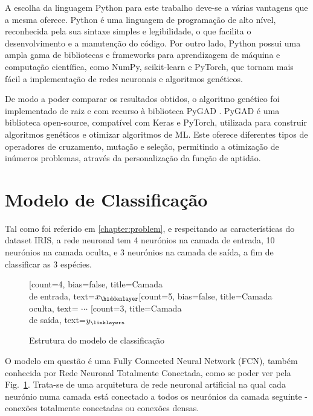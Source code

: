 A escolha da linguagem Python para este trabalho deve-se a várias vantagens que a mesma oferece. Python é uma linguagem de programação de alto nível, reconhecida pela sua sintaxe simples e legibilidade, o que facilita o desenvolvimento e a manutenção do código. Por outro lado, Python possui uma ampla gama de bibliotecas e frameworks para aprendizagem de máquina e computação científica, como NumPy, scikit-learn e PyTorch, que tornam mais fácil a implementação de redes neuronais e algoritmos genéticos.

De modo a poder comparar os resultados obtidos, o algoritmo genético foi implementado de raiz e com recurso à biblioteca PyGAD \cite{Gad2021PyGAD:Library}. PyGAD é uma biblioteca open-source, compatível com Keras e PyTorch, utilizada para construir algoritmos genéticos e otimizar algoritmos de ML. Este oferece diferentes tipos de operadores de cruzamento, mutação e seleção, permitindo a otimização de inúmeros problemas, através da personalização da função de aptidão.

\section{Modelo de Classificação}\label{sec:neural_net}

Tal como foi referido em \ref{chapter:problem}, e respeitando as características do dataset IRIS, a rede neuronal tem 4 neurónios na camada de entrada, 10 neurónios na camada oculta, e 3 neurónios na camada de saída, a fim de classificar as 3 espécies.

\begin{figure}[htbp]
    \centering
        \begin{neuralnetwork}[height=5]
        \newcommand{\x}[2]{$x_#2$}
        \newcommand{\y}[2]{$y_#2$}
        \newcommand{\h}[2]{\ifnum #2=4 $\cdots$ \else {\ifnum #2>4 $h_{10}$ \else $h_#2$ \fi} \fi}
        \newcommand{\hfirst}[2]{\small $h^{(1)}_#2$}
        [count=4, bias=false, title=Camada\\de entrada, text=\x]
        \hiddenlayer[count=5, bias=false, title=Camada oculta, text=\h] \linklayers
        \outputlayer[count=3, title=Camada\\de saída, text=\y] \linklayers
    \end{neuralnetwork}
    \caption{Estrutura do modelo de classificação}
    \label{fig:neural_net}
\end{figure}

O modelo em questão é uma Fully Connected Neural Network (FCN), também conhecida por Rede Neuronal Totalmente Conectada, como se poder ver pela Fig.~\ref{fig:neural_net}. Trata-se de uma arquitetura de rede neuronal artificial na qual cada neurónio numa camada está conectado a todos os neurónios da camada seguinte - conexões totalmente conectadas ou conexões densas.

